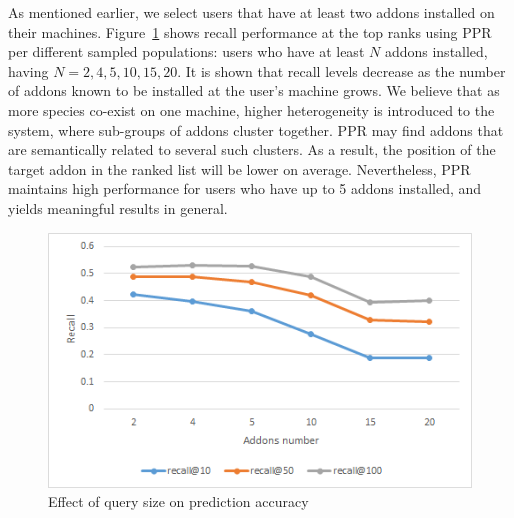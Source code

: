 \documentclass[11pt,oneside]{book}
\begin{document}
As mentioned earlier, we select users that have at least two addons installed on their machines. Figure~\ref{fig:addonsNumberGraph} shows recall performance at the top ranks using PPR per different sampled populations: users who have at least $N$ addons installed, having $N=2,4,5,10,15,20$. It is shown that recall levels decrease as the number of addons known to be installed at the user's machine grows. We believe that as more species co-exist on one machine, higher heterogeneity is introduced to the system, where sub-groups of addons cluster together. PPR may find addons that are semantically related to several such clusters. As a result, the position of the target addon in the ranked list will be lower on average. Nevertheless, PPR maintains high performance for users who have up to 5 addons installed, and yields meaningful results in general. 

\begin{figure}[!htbp]
\centering
\includegraphics[scale=1,angle=0]{figures/addonsNumberGraph.png}
\caption{Effect of query size on prediction accuracy}
\label{fig:addonsNumberGraph}
\end{figure}

\end{document}
